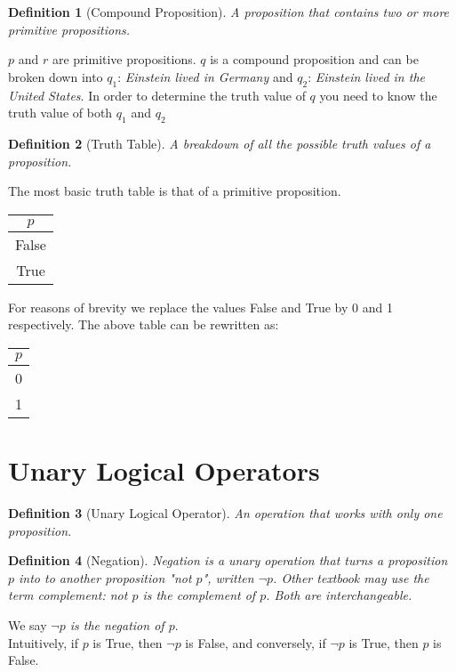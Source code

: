\documentclass[10pt,a4paper,draft,titlepage,onecolumn]{book}
\newtheorem{definition}{Definition}[section]
\begin{document}
\begin{definition}[Compound Proposition]
A proposition that contains two or more primitive propositions.  
\end{definition}
$p$ and $r$ are primitive propositions. 
$q$ is a compound proposition and can be broken down into $q_1$: \textit{Einstein lived in Germany} and $q_2$:\textit{ Einstein lived in the United States}. In order to determine the truth value of $q$ you need to know the truth value of both $q_1$ and $q_2$  \\


\begin{definition}[Truth Table]
A breakdown of all the possible truth values of a proposition. 
\end{definition}
The most basic truth table is that of a primitive proposition.
\begin{center}
\begin{tabular}{ |c| }
 \hline
 $p$ \\
 \hline
 False \\ 
 True  \\
 \hline
\end{tabular}
\end{center}
For reasons of brevity we replace the values False and True by 0 and 1 respectively. The above table can be rewritten as: 
\begin{center}
\begin{tabular}{ |c| }
 \hline
 $p$ \\
 \hline
 0 \\ 
 1 \\
 \hline
\end{tabular}
\end{center}


\section{Unary Logical Operators}
\begin{definition}[Unary Logical Operator]
An operation that works with only one proposition.
\end{definition}

\begin{definition}[Negation] Negation is a unary operation that turns a proposition $p$ into to another proposition "not $p$", written {$\neg$}$p$. Other textbook may use the term complement: not $p$ is the complement of $p$. Both are interchangeable. 
\end{definition} 
We say  \textit{{$\neg$}$p$ is the negation of $p$}. \\
Intuitively, if $p$ is True, then $\neg${$p$} is False, and conversely, if $\neg${$p$} is True, then $p$ is False.
\end{document}
